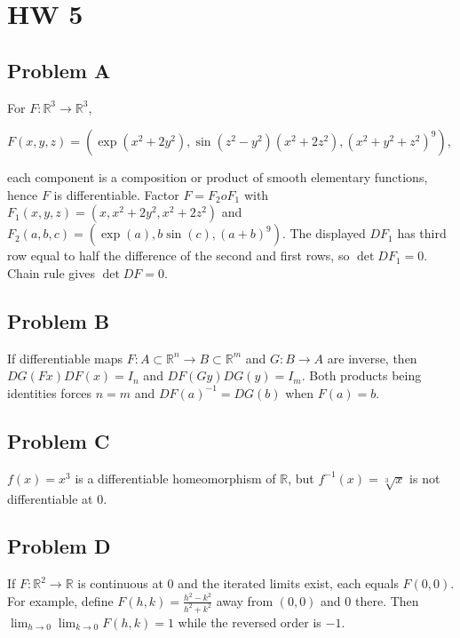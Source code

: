 \chapter{HW 5}

\section{Problem A}

For \(F:\mathbb{R}^{3}\rightarrow\mathbb{R}^{3}\),

\(F\left( {x,y,z} \right) = \left( {\exp\left( {x^{2} + 2y^{2}} \right),\sin\left( {z^{2} - y^{2}} \right)\left( {x^{2} + 2z^{2}} \right),\left( {x^{2} + y^{2} + z^{2}} \right)^{9}} \right)\),

each component is a composition or product of smooth elementary functions, hence \(F\) is differentiable. Factor \(F = F_{2}oF_{1}\) with \(F_{1}\left( {x,y,z} \right) = \left( {x,x^{2} + 2y^{2},x^{2} + 2z^{2}} \right)\) and \(F_{2}\left( {a,b,c} \right) = \left( {\exp(a),b\sin(c),\left( {a + b} \right)^{9}} \right)\). The displayed \(DF_{1}\) has third row equal to half the difference of the second and first rows, so \(\det DF_{1} = 0\). Chain rule gives \(\det DF = 0\).

\section{Problem B}

If differentiable maps \(F:A \subset \mathbb{R}^{n}\rightarrow B \subset \mathbb{R}^{m}\) and \(G:B\rightarrow A\) are inverse, then \(DG\left( {Fx} \right)DF(x) = I_{n}\) and \(DF\left( {Gy} \right)DG(y) = I_{m}\). Both products being identities forces \(n = m\) and \(D{F(a)}^{- 1} = DG(b)\) when \(F(a) = b\).

\section{Problem C}

\(f(x) = x^{3}\) is a differentiable homeomorphism of \(\mathbb{R}\), but \(f^{- 1}(x) = \sqrt[3]{x}\) is not differentiable at \(0\).

\section{Problem D}

If \(F:\mathbb{R}^{2}\rightarrow\mathbb{R}\) is continuous at \(0\) and the iterated limits exist, each equals \(F\left( {0,0} \right)\). For example, define \(F\left( {h,k} \right) = \frac{h^{2} - k^{2}}{h^{2} + k^{2}}\) away from \(\left( {0,0} \right)\) and \(0\) there. Then \(\lim_{h\rightarrow 0}\lim_{k\rightarrow 0}F\left( {h,k} \right) = 1\) while the reversed order is \(- 1\).

